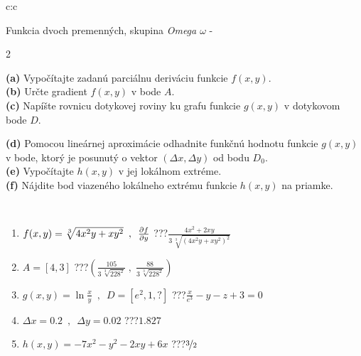 \documentclass[10pt]{report}
\begin{document}
\begin{tabular}{c:c}
\begin{minipage}[c][104.5mm][t]{0.5\linewidth}
\begin{center}
\vspace{7mm}
{\huge \LARGE Funkcia dvoch premenných, skupina \textit{Omega $\omega$} -}\\[5mm]
\begin{minipage}{0.95\linewidth}
\begin{center}
{\small \begin{multicols}{2} \raggedright
\textbf{(a)} Vypočítajte zadanú parciálnu deriváciu funkcie \(f(x,y)\). \\[1mm]
\textbf{(b)} Určte gradient \(f(x,y)\) v bode \(A\). \\[1mm]
\textbf{(c)} Napíšte rovnicu dotykovej roviny ku grafu funkcie \(g(x,y)\) v dotykovom bode \(D\). \par \columnbreak
\textbf{(d)} Pomocou lineárnej aproximácie odhadnite funkčnú hodnotu funkcie \(g(x,y)\) v bode, ktorý je posunutý o vektor \((\Delta x, \Delta y)\) od bodu \(D_0\). \\[1mm]
\textbf{(e)} Vypočítajte \(h(x,y)\) v jej lokálnom extréme. \\[1mm]
\textbf{(f)} Nájdite bod viazeného lokálneho extrému funkcie \(h(x,y)\) na priamke. \\[1mm]
\end{multicols}
}
\end{center}
\end{minipage}
\\[4mm]
\begin{minipage}{0.79\linewidth}
\begin{center}
\begin{varwidth}{\linewidth}
\begin{enumerate}
\normalsizerr
\item $f(x,y) = \sqrt[3]{4x^2y + xy^2}\enspace , \enspace \pdv{f}{y}$\quad \dotfill\; ???\;\dotfill \quad $\frac{4x^2+2xy}{3\,\sqrt[3]{(4x^2y+xy^2)^{2}}}$
\item $A = [4, 3]$\quad \dotfill\; ???\;\dotfill \quad $\left( \frac{105}{3\,\sqrt[3]{228^2}} \;,\; \frac{88}{3\,\sqrt[3]{228^2}} \right)$
\item $g(x,y) = \ln\frac{x}{y} \enspace , \enspace D=[e^{2},1,?]$\quad \dotfill\; ???\;\dotfill \quad $\frac{x}{e^3} - y - z + 3 = 0$
\item $\Delta x = {0.2} \enspace,\enspace \Delta y = {0.02}$\quad \dotfill\; ???\;\dotfill \quad $1.827$
\item $h(x,y) = -7x^2-y^2-2xy+6x$\quad \dotfill\; ???\;\dotfill \quad $\nicefrac{3}{2}$

\end{enumerate}
\end{varwidth}
\end{center}
\end{minipage}
\end{center}
\end{minipage}
\end{tabular}
\end{document}
